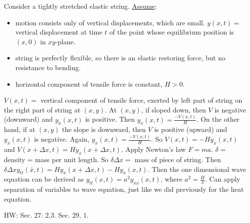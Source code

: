\documentclass[]{article}
\begin{document}
\begin{definition}
	Consider a tightly stretched elastic string.
	\underline{Assume}:
	\begin{itemize}
		\item motion consists only of vertical displacements, which are small. $y(x,t) = $ vertical displacement at time $t$ of the point whose equilibrium position is $(x,0)$ in $xy$-plane.
		\item string is perfectly flexible, so there is an elastic restoring force, but no resistance to bending.
		\item horizontal component of tensile force is constant, $H>0$.
	\end{itemize}

\end{definition}
	$V(x,t) = $ vertical component of tensile force, exerted by left part of string on the right part of string at $(x,y)$. At $(x,y)$, if sloped down, then $V$ is negative (downward) and $y_x(x,t)$ is positive. Then $y_x(x,t) = \frac{-V(x,t)}{H}$. On the other hand, if at $(x,y)$ the slope is downward, then $V$ is positive (upward) and $y_x(x,t)$ is negative. Again, $y_x(x,t) = \frac{-V(x,t)}{H}$. So $V(x,t) = -Hy_x(x,t)$ and $V(x+\Delta x,t) = Hy_x(x+\Delta x, t)$. Apply Newton's law $F=ma$. $\delta = $ density = mass per unit length. So $\delta \Delta x = $ mass of piece of string. Then $\delta \Delta x y_{tt} (\bar{x},t) = Hy_x(x+\Delta x, t) - Hy_x(x,t)$. Then the one dimensional wave equation can be derived as $y_{tt}(x,t) = a^2 y_{xx}(x,t)$, where $a^2 = \frac{H}{\delta}$.
Can apply separation of variables to wave equation, just like we did previously for the heat equation.

HW: Sec. 27: 2,3. Sec. 29, 1.
\end{document}
